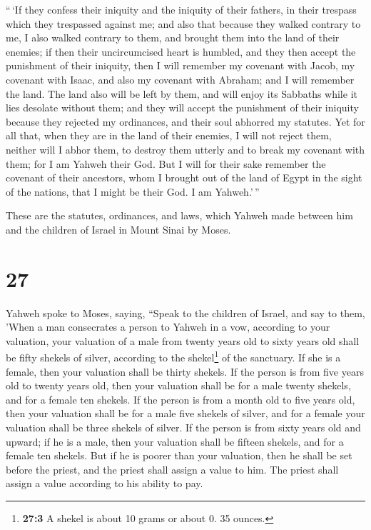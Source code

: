  ``\,`If they confess their iniquity and the iniquity of
their fathers, in their trespass which they trespassed against me; and
also that because they walked contrary to me,  I also
walked contrary to them, and brought them into the land of their
enemies; if then their uncircumcised heart is humbled, and they then
accept the punishment of their iniquity,  then I will
remember my covenant with Jacob, my covenant with Isaac, and also my
covenant with Abraham; and I will remember the land.  The
land also will be left by them, and will enjoy its Sabbaths while it
lies desolate without them; and they will accept the punishment of their
iniquity because they rejected my ordinances, and their soul abhorred my
statutes.  Yet for all that, when they are in the land of
their enemies, I will not reject them, neither will I abhor them, to
destroy them utterly and to break my covenant with them; for I am Yahweh
their God.  But I will for their sake remember the
covenant of their ancestors, whom I brought out of the land of Egypt in
the sight of the nations, that I might be their God. I am Yahweh.'\,''

 These are the statutes, ordinances, and laws, which
Yahweh made between him and the children of Israel in Mount Sinai by
Moses.

\hypertarget{section-26}{%
\section{27}\label{section-26}}

 Yahweh spoke to Moses, saying,  ``Speak to
the children of Israel, and say to them, 'When a man consecrates a
person to Yahweh in a vow, according to your valuation, 
your valuation of a male from twenty years old to sixty years old shall
be fifty shekels of silver, according to the shekel\footnote{\textbf{27:3}
  A shekel is about 10 grams or about 0. 35 ounces.} of the sanctuary.
 If she is a female, then your valuation shall be thirty
shekels.  If the person is from five years old to twenty
years old, then your valuation shall be for a male twenty shekels, and
for a female ten shekels.  If the person is from a month
old to five years old, then your valuation shall be for a male five
shekels of silver, and for a female your valuation shall be three
shekels of silver.  If the person is from sixty years old
and upward; if he is a male, then your valuation shall be fifteen
shekels, and for a female ten shekels.  But if he is
poorer than your valuation, then he shall be set before the priest, and
the priest shall assign a value to him. The priest shall assign a value
according to his ability to pay.

